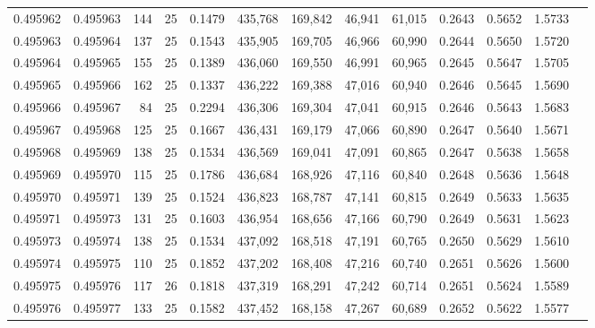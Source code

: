 \begin{tabular}{rrrrrrrrrrrrr}
0.495962 & 0.495963 &   144 &  25 &                                     0.1479 & 435,768 & 169,842 &  46,941 &  61,015 & 0.2643 & 0.5652 & 1.5733 \\
0.495963 & 0.495964 &   137 &  25 &                                     0.1543 & 435,905 & 169,705 &  46,966 &  60,990 & 0.2644 & 0.5650 & 1.5720 \\
0.495964 & 0.495965 &   155 &  25 &                                     0.1389 & 436,060 & 169,550 &  46,991 &  60,965 & 0.2645 & 0.5647 & 1.5705 \\
0.495965 & 0.495966 &   162 &  25 &                                     0.1337 & 436,222 & 169,388 &  47,016 &  60,940 & 0.2646 & 0.5645 & 1.5690 \\
0.495966 & 0.495967 &    84 &  25 &                                     0.2294 & 436,306 & 169,304 &  47,041 &  60,915 & 0.2646 & 0.5643 & 1.5683 \\
0.495967 & 0.495968 &   125 &  25 &                                     0.1667 & 436,431 & 169,179 &  47,066 &  60,890 & 0.2647 & 0.5640 & 1.5671 \\
0.495968 & 0.495969 &   138 &  25 &                                     0.1534 & 436,569 & 169,041 &  47,091 &  60,865 & 0.2647 & 0.5638 & 1.5658 \\
0.495969 & 0.495970 &   115 &  25 &                                     0.1786 & 436,684 & 168,926 &  47,116 &  60,840 & 0.2648 & 0.5636 & 1.5648 \\
0.495970 & 0.495971 &   139 &  25 &                                     0.1524 & 436,823 & 168,787 &  47,141 &  60,815 & 0.2649 & 0.5633 & 1.5635 \\
0.495971 & 0.495973 &   131 &  25 &                                     0.1603 & 436,954 & 168,656 &  47,166 &  60,790 & 0.2649 & 0.5631 & 1.5623 \\
0.495973 & 0.495974 &   138 &  25 &                                     0.1534 & 437,092 & 168,518 &  47,191 &  60,765 & 0.2650 & 0.5629 & 1.5610 \\
0.495974 & 0.495975 &   110 &  25 &                                     0.1852 & 437,202 & 168,408 &  47,216 &  60,740 & 0.2651 & 0.5626 & 1.5600 \\
0.495975 & 0.495976 &   117 &  26 &                                     0.1818 & 437,319 & 168,291 &  47,242 &  60,714 & 0.2651 & 0.5624 & 1.5589 \\
0.495976 & 0.495977 &   133 &  25 &                                     0.1582 & 437,452 & 168,158 &  47,267 &  60,689 & 0.2652 & 0.5622 & 1.5577 \\

\end{tabular}

